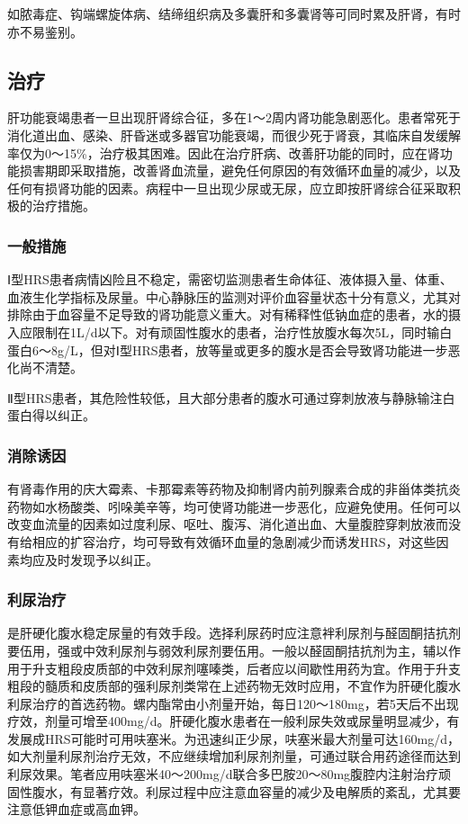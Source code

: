 如脓毒症、钩端螺旋体病、结缔组织病及多囊肝和多囊肾等可同时累及肝肾，有时亦不易鉴别。

\subsection{治疗}

肝功能衰竭患者一旦出现肝肾综合征，多在1～2周内肾功能急剧恶化。患者常死于消化道出血、感染、肝昏迷或多器官功能衰竭，而很少死于肾衰，其临床自发缓解率仅为0～15\%，治疗极其困难。因此在治疗肝病、改善肝功能的同时，应在肾功能损害期即采取措施，改善肾血流量，避免任何原因的有效循环血量的减少，以及任何有损肾功能的因素。病程中一旦出现少尿或无尿，应立即按肝肾综合征采取积极的治疗措施。

\subsubsection{一般措施}

Ⅰ型HRS患者病情凶险且不稳定，需密切监测患者生命体征、液体摄入量、体重、血液生化学指标及尿量。中心静脉压的监测对评价血容量状态十分有意义，尤其对排除由于血容量不足导致的肾功能意义重大。对有稀释性低钠血症的患者，水的摄入应限制在1L/d以下。对有顽固性腹水的患者，治疗性放腹水每次5L，同时输白蛋白6～8g/L，但对Ⅰ型HRS患者，放等量或更多的腹水是否会导致肾功能进一步恶化尚不清楚。

Ⅱ型HRS患者，其危险性较低，且大部分患者的腹水可通过穿刺放液与静脉输注白蛋白得以纠正。

\subsubsection{消除诱因}

有肾毒作用的庆大霉素、卡那霉素等药物及抑制肾内前列腺素合成的非甾体类抗炎药物如水杨酸类、吲哚美辛等，均可使肾功能进一步恶化，应避免使用。任何可以改变血流量的因素如过度利尿、呕吐、腹泻、消化道出血、大量腹腔穿刺放液而没有给相应的扩容治疗，均可导致有效循环血量的急剧减少而诱发HRS，对这些因素均应及时发现予以纠正。

\subsubsection{利尿治疗}

是肝硬化腹水稳定尿量的有效手段。选择利尿药时应注意袢利尿剂与醛固酮拮抗剂要伍用，强或中效利尿剂与弱效利尿剂要伍用。一般以醛固酮拮抗剂为主，辅以作用于升支粗段皮质部的中效利尿剂噻嗪类，后者应以间歇性用药为宜。作用于升支粗段的髓质和皮质部的强利尿剂类常在上述药物无效时应用，不宜作为肝硬化腹水利尿治疗的首选药物。螺内酯常由小剂量开始，每日120～180mg，若5天后不出现疗效，剂量可增至400mg/d。肝硬化腹水患者在一般利尿失效或尿量明显减少，有发展成HRS可能时可用呋塞米。为迅速纠正少尿，呋塞米最大剂量可达160mg/d，如大剂量利尿剂治疗无效，不应继续增加利尿剂剂量，可通过联合用药途径而达到利尿效果。笔者应用呋塞米40～200mg/d联合多巴胺20～80mg腹腔内注射治疗顽固性腹水，有显著疗效。利尿过程中应注意血容量的减少及电解质的紊乱，尤其要注意低钾血症或高血钾。

